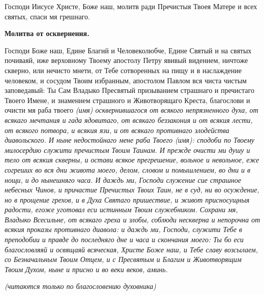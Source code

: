 Господи Иисусе Христе, Боже наш, молитв ради Пречистыя Твоея Матере и всех святых, спаси мя грешнаго.




\bfseries Молитва от осквернения.\normalfont{}


Господи Боже наш, Едине Благий и Человеколюбче, Едине Святый и на святых почиваяй, иже верховному Твоему апостолу Петру явивый видением, ничтоже скверно, или нечисто мнети, от Тебе сотворенных на пищу и в наслаждение человеком, и сосудом Твоим избранным, апостолом Павлом вся чиста чистым заповедавый: Ты Сам Владыко Пресвятый призыванием страшнаго и пречистаго Твоего Имене, и знамением страшного и Животворящаго Креста, благослови и очисти мя раба твоего \itshape (имя)\normalfont{} осквернившагося от всякого непрязненного духа, от всякаго мечтания и гада ядовитаго, от всякаго беззакония и от всякия лести, от всякого потвора, и всякия язи, и от всякаго противнаго злодейства диавольского. И ныне недостойнаго мене раба Твоего \itshape (имя)\normalfont{}: сподоби по Твоему милосердию служити пречистым Твоим Таинам. И прежде очисти ми душу и тело от всякия скверны, и остави всякое прегрешение, вольное и невольное, еже согреших во вся дни живота моего, делом, словом и помышлением, во дни и в нощи, и до нынешняго часа. И даждь ми, Господи служение сие страшное небесных Чинов, и причастие Пречистых Твоих Таин, не в суд, ни во осуждение, но в прощение грехов, и в Духа Святаго пришествие, и живот присносущныя радости, егоже уготовал еси истинным Твоим служебником. Сохрани мя, Владыко Всесильне, от всякаго греха и злобы, соблюди нескверна и непорочна от всякия проказы противнаго диавола: и даждь ми, Господи, служити Тебе в преподобии и правде до последняго дне и часа и скончания моего: Ты бо еси благословляяй и освящаяй всяческая, Христе Боже наш, и Тебе славу возсылаем, со Безначальным Твоим Отцем, и с Пресвятым и Благим и Животворящим Твоим Духом, ныне и присно и во веки веков, аминь.


\mychapterending

 


\itshape (читаются только по благословению духовника)

\normalfont{}

